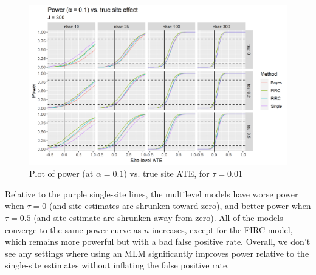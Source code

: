 \documentclass[]{article}
\begin{document}
\begin{figure}[ht]
	\centering
	\includegraphics[width=\textwidth]{power_plot_J300}
	\caption{Plot of power (at $\alpha = 0.1$) vs. true site ATE, for $\tau = 0.01$}
	\label{fig:power_plot}
\end{figure}

Relative to the purple single-site lines, the multilevel models have worse power when $\tau=0$ (and site estimates are shrunken toward zero), and better power when $\tau=0.5$ (and site estimate are shrunken away from zero).
All of the models converge to the same power curve as $\bar{n}$ increases, except for the FIRC model, which remains more powerful but with a bad false positive rate.
Overall, we don't see any settings where using an MLM significantly improves power relative to the single-site estimates without inflating the false positive rate.

\end{document}
